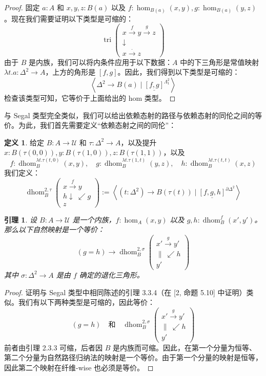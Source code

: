 \documentclass{ctexrep}
\theoremstyle{plain}
\newtheorem{lemma}[theorem]{引理}
\theoremstyle{definition}
\newtheorem{definition}[theorem]{定义}
\theoremstyle{remark}
\theoremstyle{definition}
\theoremstyle{definition}
\theoremstyle{definition}
\newcommand{\coloneqq}{\mathrel{:=}}
\newcommand{\UU}{\mathcal{U}}
\newcommand{\dhom}{\operatorname{dhom}}
\newcommand{\tri}{\operatorname{tri}}
\begin{document}
\begin{proof}
固定 $a:A$ 和 $x,y,z:B(a)$ 以及 $f:\hom_{B(a)}(x,y), g:\hom_{B(a)}(y,z)$。现在我们需要证明以下类型是可缩的：
\[
\tri\left( \begin{array}{c} x \xrightarrow{f} y \xrightarrow{g} z \\ \downarrow \\ x \xrightarrow{\cdot} z \end{array} \right)
\]
由于 $B$ 是内族，我们可以将内条件应用于以下数据：$A$ 中的下三角形是常值映射 $\lambda t.a: \Delta^2 \to A$，上方的角形是 $[f,g]$。因此，我们得到以下类型是可缩的：
\[
\left\langle \Delta^2 \to B(a) \mid \underline{[f,g]}^{\Lambda_1^2} \right\rangle
\]
检查该类型可知，它等价于上面给出的 hom 类型。
\end{proof}

与 Segal 类型完全类似，我们可以给出依赖态射的路径与依赖态射的同伦之间的等价。为此，我们首先需要定义“依赖态射之间的同伦”：

\begin{definition}
给定 $B:A\to\UU$ 和 $\tau:\Delta^2\to A$，以及提升 $x:B(\tau(0,0)), y:B(\tau(1,0)), z:B(\tau(1,1))$，以及
\[
f:\dhom_B^{\lambda t.\tau(t,0)}(x,y),\quad g:\dhom_B^{\lambda t.\tau(1,t)}(y,z),\quad h:\dhom_B^{\lambda t.\tau(t,t)}(x,z)
\]
我们定义：
\[
\dhom_B^{2,\tau}\left( \begin{array}{c}
x \xrightarrow{f} y \\
{\scriptstyle h}\downarrow \ \swarrow {\scriptstyle g} \\
z
\end{array} \right) \coloneqq \left\langle (t:\Delta^2) \to B(\tau(t)) \mid \underline{[f,g,h]}^{\partial\Delta^2} \right\rangle
\]
\end{definition}

\begin{lemma}
设 $B:A\to\UU$ 是一个内族，$f:\hom_A(x,y)$ 以及 $g,h:\dhom_B^f(x',y')$。那么以下自然映射是一个等价：
\[
(g = h) \to \dhom_B^{2,\sigma}\left( \begin{array}{c}
x' \xrightarrow{g} y' \\
\| \ \swarrow {\scriptstyle h} \\
y'
\end{array} \right)
\]
其中 $\sigma:\Delta^2\to A$ 是由 $f$ 确定的退化三角形。
\end{lemma}

\begin{proof}
证明与 Segal 类型中相同陈述的引理 3.3.4（在 [2, 命题 5.10] 中证明）类似。我们有以下两种类型是可缩的，因此等价：
\[
(g = h) \quad \text{和} \quad \dhom_B^{2,\sigma}\left( \begin{array}{c}
x' \xrightarrow{g} y' \\
\| \ \swarrow {\scriptstyle h} \\
y'
\end{array} \right)
\]
前者由引理 2.3.3 可缩，后者因 $B$ 是内族而可缩。因此，在第一个分量为恒等、第二个分量为自然路径归纳法的映射是一个等价。由于第一个分量的映射是恒等，因此第二个映射在纤维-wise 也必须是等价。
\end{proof}
\end{document}
